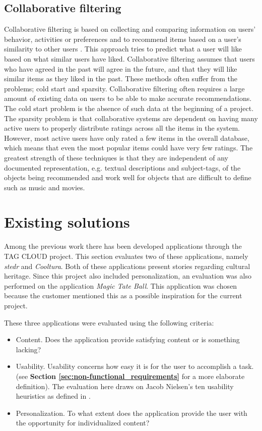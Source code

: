 \subsection{Collaborative filtering}
\label{subsec:prestudy_collaborative}

Collaborative filtering is based on collecting and comparing information on users' behavior, activities or preferences and to recommend items based on a user's similarity to other users \cite{HM6}. This approach tries to predict what a user will like based on what similar users have liked. Collaborative filtering assumes that users who have agreed in the past will agree in the future, and that they will like similar items as they liked in the past. These methods often suffer from the problems; cold start and sparsity. Collaborative filtering often requires a large amount of existing data on users to be able to make accurate recommendations. The cold start problem is the absence of such data at the beginning of a project. The sparsity problem is that collaborative systems are dependent on having many active users to properly distribute ratings across all the items in the system. However, most active users have only rated a few items in the overall database, which means that even the most popular items could have very few ratings. The greatest strength of these techniques is that they are independent of any documented representation, e.g. textual descriptions and subject-tags, of the objects being recommended and work well for objects that are difficult to define such as music and movies.\cite{HM4}

\section{Existing solutions}
\label{sec:existing_solutions}

Among the previous work there has been developed applications through the TAG CLOUD project. This section evaluates two of these applications, namely \textit{stedr} and \textit{Cooltura}. Both of these applications present stories regarding cultural heritage. Since this project also included personalization, an evaluation was also performed on the application \textit{Magic Tate Ball}. This application was chosen because the customer mentioned this as a possible inspiration for the current project. \newline

These three applications were evaluated using the following criteria:
\begin{itemize}
\item Content. Does the application provide satisfying content or is something lacking?
\item Usability. Usability concerns how easy it is for the user to accomplish a task. (see \textbf{Section \ref{sec:non-functional_requirements}} for a more elaborate definition). The evaluation here draws on Jacob Nielsen’s ten usability heuristics as defined in \cite{AS3}.  
\item Personalization. To what extent does the application provide the user with the opportunity for individualized content?
\end{itemize}

